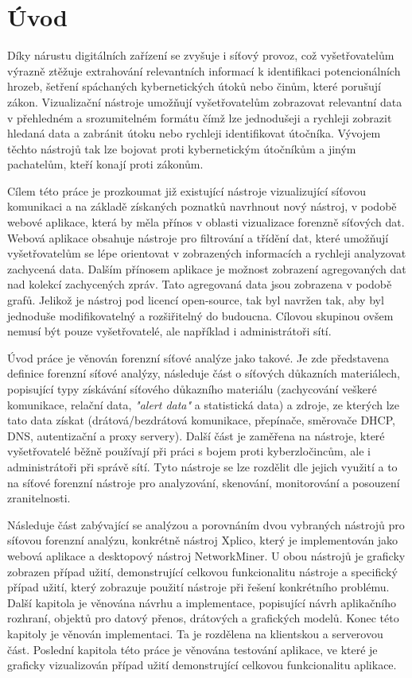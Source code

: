 \chapter{Úvod}    
    Díky nárustu digitálních zařízení se zvyšuje i síťový provoz, což vyšetřovatelům výrazně ztěžuje extrahování relevantních informací k identifikaci potencionálních hrozeb, šetření spáchaných kybernetických útoků nebo činům, které porušují zákon. Vizualizační nástroje umožňují vyšetřovatelům zobrazovat relevantní data v přehledném a srozumitelném formátu čímž lze jednodušeji a rychleji zobrazit hledaná data a zabránit útoku nebo rychleji identifikovat útočníka. Vývojem těchto nástrojů tak lze bojovat proti kybernetickým útočníkům a jiným pachatelům, kteří konají proti zákonům.

    
    Cílem této práce je prozkoumat již existující nástroje vizualizující síťovou komunikaci a na základě získaných poznatků navrhnout nový nástroj, v podobě webové aplikace, která by měla přínos v oblasti vizualizace forenzně síťových dat. Webová aplikace obsahuje nástroje pro filtrování a třídění dat, které umožňují vyšetřovatelům se lépe orientovat v zobrazených informacích a rychleji analyzovat zachycená data. Dalším přínosem aplikace je možnost zobrazení agregovaných dat nad kolekcí zachycených zpráv. Tato agregovaná data jsou zobrazena v podobě grafů. Jelikož je nástroj pod licencí open-source, tak byl navržen tak, aby byl jednoduše modifikovatelný a rozšiřitelný do budoucna. Cílovou skupinou ovšem nemusí být pouze vyšetřovatelé, ale například i administrátoři sítí.

    Úvod práce je věnován forenzní síťové analýze jako takové. Je zde představena definice forenzní síťové analýzy, následuje část o síťových důkazních materiálech, popisující typy získávání síťového důkazního materiálu (zachycování veškeré komunikace, relační data, \textit{"alert data"} \newline a statistická data) a zdroje, ze kterých lze tato data získat (drátová/bezdrátová komunikace, přepínače, směrovače \gls{DHCP}, \gls{DNS}, autentizační a proxy servery). Další část je zaměřena na nástroje, které vyšetřovatelé běžně používají při práci s bojem proti kyberzločincům, ale i administrátoři při správě sítí. Tyto nástroje se lze rozdělit dle jejich využití a to na síťové forenzní nástroje pro analyzování, skenování, monitorování a posouzení zranitelnosti.

    Následuje část zabývající se analýzou a porovnáním dvou vybraných nástrojů pro síťovou forenzní analýzu, konkrétně nástroj Xplico, který je implementován jako webová aplikace \newline a desktopový nástroj NetworkMiner. U obou nástrojů je graficky zobrazen případ užití, demonstrující celkovou funkcionalitu nástroje a specifický případ užití, který zobrazuje použití nástroje při řešení konkrétního problému. Další kapitola je věnována návrhu a implementace, popisující návrh aplikačního rozhraní, objektů pro datový přenos, drátových a grafických modelů. Konec této kapitoly je věnován implementaci. Ta je rozdělena na klientskou a serverovou část. Poslední kapitola této práce je věnována testování aplikace, ve které je graficky vizualizován případ užití demonstrující celkovou funkcionalitu aplikace.

